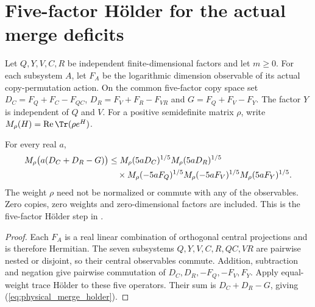 \section{Five-factor H\"older for the actual merge deficits}
\label{sec:physical_merge_holder}

Let $Q,Y,V,C,R$ be independent finite-dimensional factors and let $m\ge0$.
For each subsystem $A$, let $F_A$ be the logarithmic dimension observable
of its actual copy-permutation action. On the common five-factor copy
space set $D_C=F_Q+F_C-F_{QC}$, $D_R=F_V+F_R-F_{VR}$ and
$G=F_Q+F_V-F_Y$. The factor $Y$ is independent of $Q$ and $V$.
For a positive semidefinite matrix $\rho$, write
$M_\rho(H)=\operatorname{Re}\Tr(\rho e^H)$.

\begin{theorem}
\label{thm:physical_merge_holder}
\leanok
For every real $a$,
\begin{align}
 M_\rho\bigl(a(D_C+D_R-G)\bigr)
 &\le M_\rho(5aD_C)^{1/5}M_\rho(5aD_R)^{1/5}\notag\\
 &\quad\times M_\rho(-5aF_Q)^{1/5}M_\rho(-5aF_V)^{1/5}
       M_\rho(5aF_Y)^{1/5}.
 \label{eq:physical_merge_holder}
\end{align}
The weight $\rho$ need not be normalized or commute with any of the
observables. Zero copies, zero weights and zero-dimensional factors are
included. This is the five-factor H\"older step in
\cite[Section~7, lines~556--560]{OpenAI2026AreaLaw}.
\end{theorem}
\begin{proof}
\leanok
Each $F_A$ is a real linear combination of orthogonal central
projections and is therefore Hermitian. The seven subsystems
$Q,Y,V,C,R,QC,VR$ are pairwise nested or disjoint, so their central
observables commute. Addition, subtraction and negation give pairwise
commutation of $D_C,D_R,-F_Q,-F_V,F_Y$. Apply equal-weight trace
H\"older to these five operators. Their sum is $D_C+D_R-G$, giving
(\ref{eq:physical_merge_holder}).
\end{proof}

